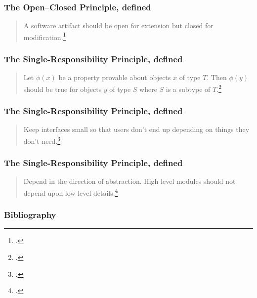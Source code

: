\documentclass[aspectratio=169]{beamer}
\begin{document}

\begin{frame}
  \frametitle{The Open--Closed Principle, defined}

  \begin{quote}
    A software artifact should be open for extension but closed for
    modification.\footnote{\cite[p.~70]{clean-arch}.}
  \end{quote}
\end{frame}


\begin{frame}
  \frametitle{The Single-Responsibility Principle, defined}

  \begin{quote}
    Let $\phi(x)$ be a property provable about objects $x$ of type $T$. Then
    $\phi(y)$  should be true for objects $y$ of type $S$ where $S$
    is a subtype of $T$.\footnote{\cite[p.~1812]{liskov}.}
  \end{quote}
\end{frame}


\begin{frame}
  \frametitle{The Single-Responsibility Principle, defined}

  \begin{quote}
    Keep interfaces small so that users don't end up depending on things they
    don't need.\footnote{\cite{solid-relevance}.}
  \end{quote}
\end{frame}


\begin{frame}
  \frametitle{The Single-Responsibility Principle, defined}

  \begin{quote}
    Depend in the direction of abstraction. High level modules should not depend
    upon low level details.\footnote{\cite{solid-relevance}.}
  \end{quote}
\end{frame}


\begin{frame}
  \frametitle{Bibliography}
  \begin{centering}
    \printbibliography
  \end{centering}
\end{frame}
\end{document}
